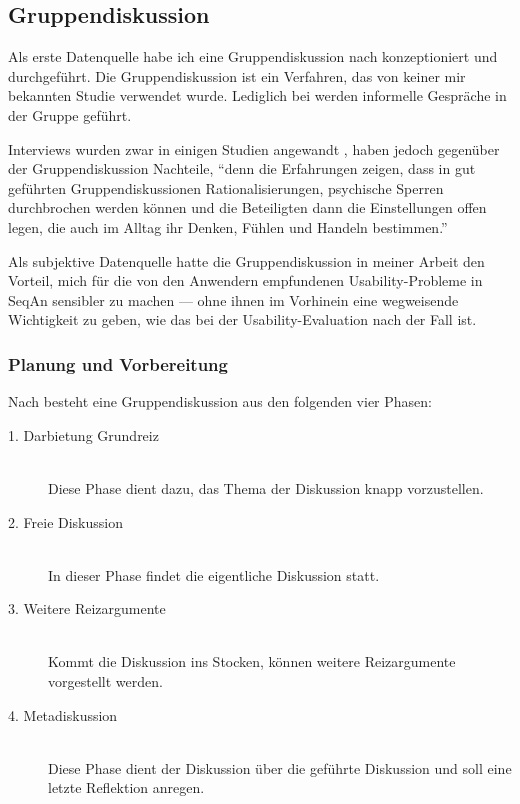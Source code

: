 \subsection{Gruppendiskussion}
\label{sec:gruppendiskussion}

Als erste Datenquelle habe ich eine Gruppendiskussion nach \cite{mayring2002einfhrung} konzeptioniert und durchgeführt. Die Gruppendiskussion ist ein Verfahren, das von keiner mir bekannten Studie verwendet wurde. Lediglich bei \cite{Tenny:2011jp} werden informelle Gespräche in der Gruppe geführt. 

Interviews wurden zwar in einigen Studien angewandt \citep[vgl.][]{deSouza:2004fd,Letondal:2006dy,Grill:2012jm,Piccioni:2013uq}, haben jedoch gegenüber der Gruppendiskussion Nachteile, ``denn die Erfahrungen zeigen, dass in gut geführten Gruppendiskussionen Rationalisierungen, psychische Sperren durchbrochen werden können und die Beteiligten dann die Einstellungen offen legen, die auch im Alltag ihr Denken, Fühlen und Handeln bestimmen.'' \citep[][S. 77]{mayring2002einfhrung}

Als subjektive Datenquelle hatte die Gruppendiskussion in meiner Arbeit den Vorteil, mich für die von den Anwendern empfundenen Usability-Probleme in SeqAn sensibler zu machen --- ohne ihnen im Vorhinein eine wegweisende Wichtigkeit zu geben, wie das bei der Usability-Evaluation nach \cite{Grill:2012jm} der Fall ist.


\subsubsection{Planung und Vorbereitung}

Nach \cite{mayring2002einfhrung} besteht eine Gruppendiskussion aus den folgenden vier Phasen:

\begin{description}
  \item[1. Darbietung Grundreiz] \hfill \\ Diese Phase dient dazu, das Thema der Diskussion knapp vorzustellen.
  \item[2. Freie Diskussion] \hfill \\ In dieser Phase findet die eigentliche Diskussion statt. 
  \item[3. Weitere Reizargumente] \hfill \\ Kommt die Diskussion ins Stocken, können weitere Reizargumente vorgestellt werden.
  \item[4. Metadiskussion] \hfill \\ Diese Phase dient der Diskussion über die geführte Diskussion und soll eine letzte Reflektion anregen.
\end{description}

